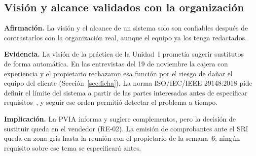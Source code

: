 \subsection{Visión y alcance validados con la organización}

\textbf{Afirmación.} La visión y el alcance de un sistema solo son confiables después de contrastarlos con la organización real, aunque el equipo ya los tenga redactados.

\textbf{Evidencia.} La visión de la práctica de la Unidad~I prometía sugerir sustitutos de forma automática. En las entrevistas del 19 de noviembre la cajera con experiencia y el propietario rechazaron esa función por el riesgo de dañar el equipo del cliente (Sección~\ref{sec:ficha}). La norma ISO/IEC/IEEE 29148:2018 pide definir el límite del sistema a partir de las partes interesadas antes de especificar requisitos~\cite{iso29148}, y seguir ese orden permitió detectar el problema a tiempo.

\textbf{Implicación.} La PVIA informa y sugiere complementos, pero la decisión de sustituir queda en el vendedor (RE-02). La emisión de comprobantes ante el SRI queda en zona gris hasta la reunión con el propietario de la semana~6; ningún requisito sobre ese tema se especificará antes.
